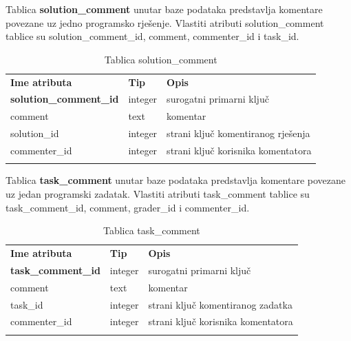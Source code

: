 \documentclass[times, utf8, zavrsni, numeric]{fer}
\begin{document}
		Tablica \textbf{solution\_comment} unutar baze podataka predstavlja komentare povezane uz jedno programsko rješenje. Vlastiti atributi solution\_comment tablice su solution\_comment\_id, comment, commenter\_id i task\_id. 
		\begin{table}[H]
			\caption{Tablica solution\_comment}
			\label{tbl:solutioncomment}
			\centering
			\begin{tabu} to \textwidth {XXX}
				\tabucline[1.75pt]{-}
				\textbf{Ime atributa} & \textbf{Tip} & \textbf{Opis}\\ 				
				\tabucline[1.75pt]{-}
				\textbf{solution\_comment\_id} & integer & surogatni primarni ključ\\ \hline
				comment & text & komentar\\ \hline
				solution\_id & integer & strani ključ komentiranog rješenja\\ \hline
				commenter\_id & integer & strani ključ korisnika komentatora\\ \hline
				\tabucline[1.75pt]{-}
			\end{tabu}
		\end{table}
	
		Tablica \textbf{task\_comment} unutar baze podataka predstavlja komentare povezane uz jedan programski zadatak. Vlastiti atributi task\_comment tablice su task\_comment\_id, comment, grader\_id i commenter\_id. 
		\begin{table}[H]
			\caption{Tablica task\_comment}
			\label{tbl:taskcomment}
			\centering
			\begin{tabu} to \textwidth {XXX}
				\tabucline[1.75pt]{-}
				\textbf{Ime atributa} & \textbf{Tip} & \textbf{Opis}\\ 				
				\tabucline[1.75pt]{-}
				\textbf{task\_comment\_id} & integer & surogatni primarni ključ\\ \hline
				comment & text & komentar\\ \hline
				task\_id & integer & strani ključ komentiranog zadatka\\ \hline
				commenter\_id & integer & strani ključ korisnika komentatora\\ \hline
				\tabucline[1.75pt]{-}
			\end{tabu}
		\end{table}
	
\end{document}

